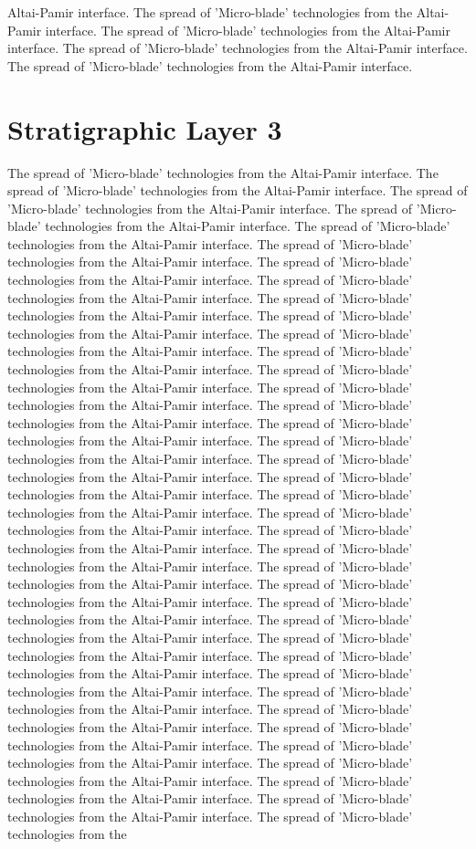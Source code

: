 Altai-Pamir interface. The spread of 'Micro-blade' technologies from the Altai-Pamir interface. The spread of 'Micro-blade' technologies from the Altai-Pamir interface. The spread of 'Micro-blade' technologies from the Altai-Pamir interface. The spread of 'Micro-blade' technologies from the Altai-Pamir interface. 

\section{Stratigraphic Layer 3}
The spread of 'Micro-blade' technologies from the Altai-Pamir interface. The spread of 'Micro-blade' technologies from the Altai-Pamir interface. The spread of 'Micro-blade' technologies from the Altai-Pamir interface. The spread of 'Micro-blade' technologies from the Altai-Pamir interface. The spread of 'Micro-blade' technologies from the Altai-Pamir interface. The spread of 'Micro-blade' technologies from the Altai-Pamir interface. The spread of 'Micro-blade' technologies from the Altai-Pamir interface. The spread of 'Micro-blade' technologies from the Altai-Pamir interface. The spread of 'Micro-blade' technologies from the Altai-Pamir interface. The spread of 'Micro-blade' technologies from the Altai-Pamir interface. The spread of 'Micro-blade' technologies from the Altai-Pamir interface. The spread of 'Micro-blade' technologies from the Altai-Pamir interface. The spread of 'Micro-blade' technologies from the Altai-Pamir interface. The spread of 'Micro-blade' technologies from the Altai-Pamir interface. The spread of 'Micro-blade' technologies from the Altai-Pamir interface. The spread of 'Micro-blade' technologies from the Altai-Pamir interface. The spread of 'Micro-blade' technologies from the Altai-Pamir interface. The spread of 'Micro-blade' technologies from the Altai-Pamir interface. The spread of 'Micro-blade' technologies from the Altai-Pamir interface. The spread of 'Micro-blade' technologies from the Altai-Pamir interface. The spread of 'Micro-blade' technologies from the Altai-Pamir interface. The spread of 'Micro-blade' technologies from the Altai-Pamir interface. The spread of 'Micro-blade' technologies from the Altai-Pamir interface. The spread of 'Micro-blade' technologies from the Altai-Pamir interface. The spread of 'Micro-blade' technologies from the Altai-Pamir interface. The spread of 'Micro-blade' technologies from the Altai-Pamir interface. The spread of 'Micro-blade' technologies from the Altai-Pamir interface. The spread of 'Micro-blade' technologies from the Altai-Pamir interface. The spread of 'Micro-blade' technologies from the Altai-Pamir interface. The spread of 'Micro-blade' technologies from the Altai-Pamir interface. The spread of 'Micro-blade' technologies from the Altai-Pamir interface. The spread of 'Micro-blade' technologies from the Altai-Pamir interface. The spread of 'Micro-blade' technologies from the Altai-Pamir interface. The spread of 'Micro-blade' technologies from the Altai-Pamir interface. The spread of 'Micro-blade' technologies from the Altai-Pamir interface. The spread of 'Micro-blade' technologies from the Altai-Pamir interface. The spread of 'Micro-blade' technologies from the Altai-Pamir interface. The spread of 'Micro-blade' technologies from the 